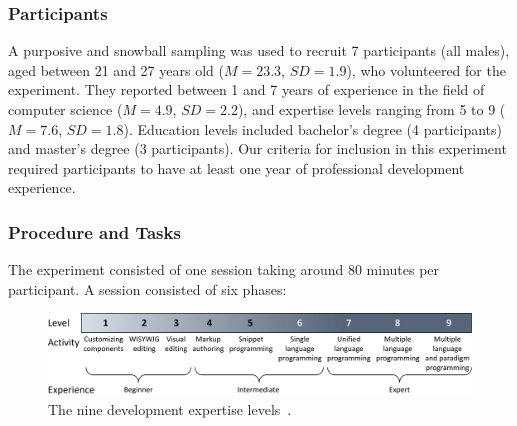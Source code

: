 \subsubsection{Participants}
A purposive and snowball sampling was used to recruit 7 participants (all males), aged between 21 and 27 years old ($M{=}23.3$, $SD{=}1.9$), who volunteered for the experiment. They reported between 1 and 7 years of experience in the field of computer science ($M{=}4.9$, $SD{=}2.2$), and expertise levels ranging from 5 to 9 ($M{=}7.6$, $SD{=}1.8$). Education levels included bachelor's degree (4 participants) and master's degree (3 participants). Our criteria for inclusion in this experiment required participants to have at least one year of professional development experience.

\subsubsection{Procedure and Tasks}
The experiment consisted of one session taking around 80 minutes per participant. A session consisted of six phases:

\begin{figure}[tb]
    \centering
    \includegraphics[width=\linewidth]{Figures/QuantumLeap/Evaluation/expertise-levels.pdf}
    \vspace{-8pt}
    \caption{The nine development expertise levels~\cite{Costabile:2008}.} %
    \label{fig:quantumleap:expertise}
\end{figure}

